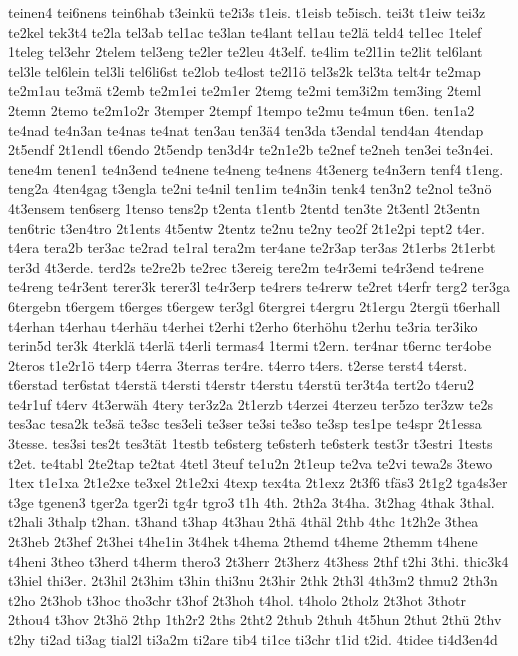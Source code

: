 {teinen4
tei6nens
tein6hab
t3einkü
te2i3s
t1eis.
t1eisb
te5isch.
tei3t
t1eiw
tei3z
te2kel
tek3t4
te2la
tel3ab
tel1ac
te3lan
te4lant
tel1au
te2lä
teld4
tel1ec
1telef
1teleg
tel3ehr
2telem
tel3eng
te2ler
te2leu
4t3elf.
te4lim
te2l1in
te2lit
tel6lant
tel3le
tel6lein
tel3li
tel6li6st
te2lob
te4lost
te2l1ö
tel3s2k
tel3ta
telt4r
te2map
te2m1au
te3mä
t2emb
te2m1ei
te2m1er
2temg
te2mi
tem3i2m
tem3ing
2teml
2temn
2temo
te2m1o2r
3temper
2tempf
1tempo
te2mu
te4mun
t6en.
ten1a2
te4nad
te4n3an
te4nas
te4nat
ten3au
ten3ä4
ten3da
t3endal
tend4an
4tendap
2t5endf
2t1endl
t6endo
2t5endp
ten3d4r
te2n1e2b
te2nef
te2neh
ten3ei
te3n4ei.
tene4m
tenen1
te4n3end
te4nene
te4neng
te4nens
4t3energ
te4n3ern
tenf4
t1eng.
teng2a
4ten4gag
t3engla
te2ni
te4nil
ten1im
te4n3in
tenk4
ten3n2
te2nol
te3nö
4t3ensem
ten6serg
1tenso
tens2p
t2enta
t1entb
2tentd
ten3te
2t3entl
2t3entn
ten6tric
t3en4tro
2t1ents
4t5entw
2tentz
te2nu
te2ny
teo2f
2t1e2pi
tept2
t4er.
t4era
tera2b
ter3ac
te2rad
te1ral
tera2m
ter4ane
te2r3ap
ter3as
2t1erbs
2t1erbt
ter3d
4t3erde.
terd2s
te2re2b
te2rec
t3ereig
tere2m
te4r3emi
te4r3end
te4rene
te4reng
te4r3ent
terer3k
terer3l
te4r3erp
te4rers
te4rerw
te2ret
t4erfr
terg2
ter3ga
6tergebn
t6ergem
t6erges
t6ergew
ter3gl
6tergrei
t4ergru
2t1ergu
2tergü
t6erhall
t4erhan
t4erhau
t4erhäu
t4erhei
t2erhi
t2erho
6terhöhu
t2erhu
te3ria
ter3iko
terin5d
ter3k
4terklä
t4erlä
t4erli
termas4
1termi
t2ern.
ter4nar
t6ernc
ter4obe
2teros
t1e2r1ö
t4erp
t4erra
3terras
ter4re.
t4erro
t4ers.
t2erse
terst4
t4erst.
t6erstad
ter6stat
t4erstä
t4ersti
t4erstr
t4erstu
t4erstü
ter3t4a
tert2o
t4eru2
te4r1uf
t4erv
4t3erwäh
4tery
ter3z2a
2t1erzb
t4erzei
4terzeu
ter5zo
ter3zw
te2s
tes3ac
tesa2k
te3sä
te3sc
tes3eli
te3ser
te3si
te3so
te3sp
tes1pe
te4spr
2t1essa
3tesse.
tes3si
tes2t
tes3tät
1testb
te6sterg
te6sterh
te6sterk
test3r
t3estri
1tests
t2et.
te4tabl
2te2tap
te2tat
4tetl
3teuf
te1u2n
2t1eup
te2va
te2vi
tewa2s
3tewo
1tex
t1e1xa
2t1e2xe
te3xel
2t1e2xi
4texp
tex4ta
2t1exz
2t3f6
tfäs3
2t1g2
tga4s3er
t3ge
tgenen3
tger2a
tger2i
tg4r
tgro3
t1h
4th.
2th2a
3t4ha.
3t2hag
4thak
3thal.
t2hali
3thalp
t2han.
t3hand
t3hap
4t3hau
2thä
4thäl
2thb
4thc
1t2h2e
3thea
2t3heb
2t3hef
2t3hei
t4he1in
3t4hek
t4hema
2themd
t4heme
2themm
t4hene
t4heni
3theo
t3herd
t4herm
thero3
2t3herr
2t3herz
4t3hess
2thf
t2hi
3thi.
thic3k4
t3hiel
thi3er.
2t3hil
2t3him
t3hin
thi3nu
2t3hir
2thk
2th3l
4th3m2
thmu2
2th3n
t2ho
2t3hob
t3hoc
tho3chr
t3hof
2t3hoh
t4hol.
t4holo
2tholz
2t3hot
3thotr
2thou4
t3hov
2t3hö
2thp
1th2r2
2ths
2tht2
2thub
2thuh
4t5hun
2thut
2thü
2thv
t2hy
ti2ad
ti3ag
tial2l
ti3a2m
ti2are
tib4
ti1ce
ti3chr
t1id
t2id.
4tidee
ti4d3en4d
}
